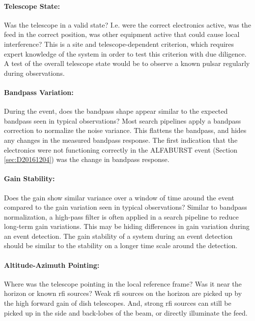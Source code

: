 \documentclass[a4paper,fleqn,usenatbib]{mnras}
\begin{document}
\paragraph{Telescope State:}

Was the telescope in a valid state? I.e. were the correct electronics active,
was the feed in the correct position, was other equipment active that could
cause local interference? This is a site and telescope-dependent criterion,
which requires expert knowledge of the system in order to test this criterion
with due diligence.  A test of the overall telescope state would be to observe a
known pulsar regularly during observations.

\paragraph{Bandpass Variation:}

During the event, does the bandpass shape appear similar to the expected
bandpass seen in typical observations? Most search pipelines apply a bandpass
correction to normalize the noise variance. This flattens the bandpass, and
hides any changes in the measured bandpass response. The first indication that
the electronics were not functioning correctly in the ALFABURST event (Section
\ref{sec:D20161204}) was the change in bandpass response.

\paragraph{Gain Stability:}

Does the gain show similar variance over a window of time around the event
compared to the gain variation seen in typical observations? Similar to bandpass
normalization, a high-pass filter is often applied in a search pipeline to
reduce long-term gain variations. This may be hiding differences in gain
variation during an event detection. The gain stability of a system during an
event detection should be similar to the stability on a longer time scale around
the detection.

\paragraph{Altitude-Azimuth Pointing:}

Where was the telescope pointing in the local reference frame? Was it near the
horizon or known \gls{rfi} sources? Weak \gls{rfi} sources on the horizon are
picked up by the high forward gain of dish telescopes. And, strong \gls{rfi}
sources can still be picked up in the side and back-lobes of the beam, or
directly illuminate the feed.
\end{document}
